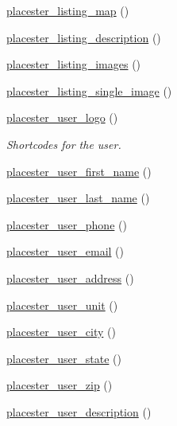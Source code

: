 \begin{DoxyCompactItemize}
\hyperlink{shortcodes_8php_a471f574ca2510068457685a45139f64c}{placester\_\-listing\_\-map} ()
\item 
\hyperlink{shortcodes_8php_a7472bd1bb1c8f63fb57d608b34fad087}{placester\_\-listing\_\-description} ()
\item 
\hyperlink{shortcodes_8php_ae1872f3305dcbaf2e1cd9b649d19a0ae}{placester\_\-listing\_\-images} ()
\item 
\hyperlink{shortcodes_8php_a3603cb2fb9380fef075c15fb44154b89}{placester\_\-listing\_\-single\_\-image} ()
\item 
\hyperlink{shortcodes_8php_a70ba671c3d33ca54b51a4d6de78152f9}{placester\_\-user\_\-logo} ()
\begin{DoxyCompactList}\small\item\em Shortcodes for the user. \end{DoxyCompactList}\item 
\hyperlink{shortcodes_8php_ac25d94856341d05e2c332130b81b20fa}{placester\_\-user\_\-first\_\-name} ()
\item 
\hyperlink{shortcodes_8php_af94d550e8741ae8958910812387098b3}{placester\_\-user\_\-last\_\-name} ()
\item 
\hyperlink{shortcodes_8php_a44492646fce7e5e34278a67ce02cf969}{placester\_\-user\_\-phone} ()
\item 
\hyperlink{shortcodes_8php_add9394be99fab7200917fc298642c33d}{placester\_\-user\_\-email} ()
\item 
\hyperlink{shortcodes_8php_a93502a1c89cfbd2c4db4d93b637d8a9f}{placester\_\-user\_\-address} ()
\item 
\hyperlink{shortcodes_8php_a065c12f49394023a26bd4722bf6c0b66}{placester\_\-user\_\-unit} ()
\item 
\hyperlink{shortcodes_8php_a07b36889410e951f15a0a99461a3a52b}{placester\_\-user\_\-city} ()
\item 
\hyperlink{shortcodes_8php_a5d69fa3509e72617f193222b83e163d7}{placester\_\-user\_\-state} ()
\item 
\hyperlink{shortcodes_8php_a0dbc37fff7b7bbe90b0f2b4df1a1f0e5}{placester\_\-user\_\-zip} ()
\item 
\hyperlink{shortcodes_8php_a36dd1a1ed0424ae2a61ff3110b5370b8}{placester\_\-user\_\-description} ()
\end{DoxyCompactItemize}



